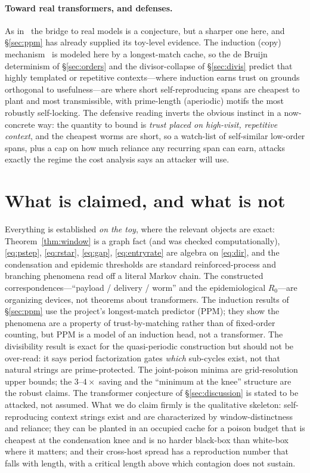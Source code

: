 \documentclass[11pt]{article}
\theoremstyle{plain}
\theoremstyle{definition}
\theoremstyle{remark}
\newcommand{\Rzero}{R_{0}}
\begin{document}
\paragraph{Toward real transformers, and defenses.} As in~\cite{shumow2026trust} the bridge to
real models is a conjecture, but a sharper one here, and \S\ref{sec:ppm} has already supplied
its toy-level evidence. The induction (copy) mechanism~\cite{olsson2022} is modeled here by a
longest-match cache, so the de Bruijn determinism of \S\ref{sec:orders} and the
divisor-collapse of \S\ref{sec:divis} predict that highly templated or repetitive contexts---where
induction earns trust on grounds orthogonal to usefulness---are where short self-reproducing spans
are cheapest to plant and most transmissible, with prime-length (aperiodic) motifs the most
robustly self-locking. The defensive reading inverts the obvious instinct in a now-concrete way:
the quantity to bound is \emph{trust placed on high-visit, repetitive context}, and the cheapest
worms are short, so a watch-list of self-similar low-order spans, plus a cap on how much reliance
any recurring span can earn, attacks exactly the regime the cost analysis says an attacker will
use.

\section{What is claimed, and what is not}\label{sec:honesty}
Everything is established \emph{on the toy}, where the relevant objects are exact:
Theorem~\ref{thm:window} is a graph fact (and was checked computationally), \eqref{eq:pstep},
\eqref{eq:rstar}, \eqref{eq:gap}, \eqref{eq:entryrate} are algebra on \eqref{eq:dir}, and the
condensation and epidemic thresholds are standard reinforced-process and branching phenomena read
off a literal Markov chain. The constructed correspondences---``payload / delivery / worm'' and the
epidemiological $\Rzero$---are organizing devices, not theorems about transformers. The
induction results of \S\ref{sec:ppm} use the project's longest-match predictor (PPM); they show
the phenomena are a property of trust-by-matching rather than of fixed-order counting, but PPM
is a model of an induction head, not a transformer. The
divisibility result is exact for the quasi-periodic construction but should not be over-read: it
says period factorization gates \emph{which} sub-cycles exist, not that natural strings are
prime-protected. The joint-poison minima are grid-resolution upper bounds; the $3$--$4\times$
saving and the ``minimum at the knee'' structure are the robust claims. The transformer
conjecture of \S\ref{sec:discussion} is stated to be attacked, not assumed. What we do claim
firmly is the qualitative skeleton: self-reproducing context strings exist and are characterized
by window-distinctness and reliance; they can be planted in an occupied cache for a poison budget
that is cheapest at the condensation knee and is no harder black-box than white-box where it
matters; and their cross-host spread has a reproduction number that falls with length, with a
critical length above which contagion does not sustain.
\end{document}
